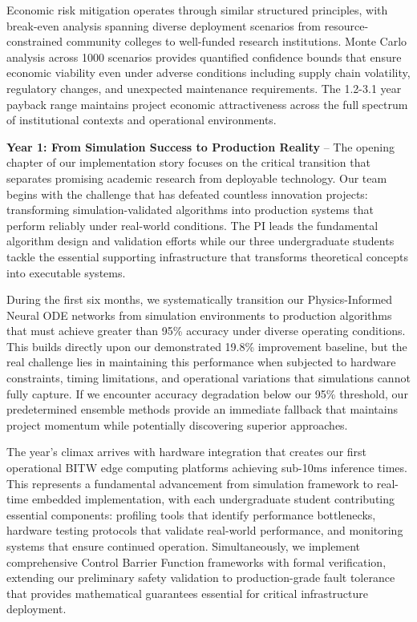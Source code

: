 \documentclass[12pt]{article}
\begin{document}
Economic risk mitigation operates through similar structured principles, with break-even analysis spanning diverse deployment scenarios from resource-constrained community colleges to well-funded research institutions. Monte Carlo analysis across 1000 scenarios provides quantified confidence bounds that ensure economic viability even under adverse conditions including supply chain volatility, regulatory changes, and unexpected maintenance requirements. The 1.2-3.1 year payback range maintains project economic attractiveness across the full spectrum of institutional contexts and operational environments.

\textbf{Year 1: From Simulation Success to Production Reality} – The opening chapter of our implementation story focuses on the critical transition that separates promising academic research from deployable technology. Our team begins with the challenge that has defeated countless innovation projects: transforming simulation-validated algorithms into production systems that perform reliably under real-world conditions. The PI leads the fundamental algorithm design and validation efforts while our three undergraduate students tackle the essential supporting infrastructure that transforms theoretical concepts into executable systems.

During the first six months, we systematically transition our Physics-Informed Neural ODE networks from simulation environments to production algorithms that must achieve greater than 95\% accuracy under diverse operating conditions. This builds directly upon our demonstrated 19.8\% improvement baseline, but the real challenge lies in maintaining this performance when subjected to hardware constraints, timing limitations, and operational variations that simulations cannot fully capture. If we encounter accuracy degradation below our 95\% threshold, our predetermined ensemble methods provide an immediate fallback that maintains project momentum while potentially discovering superior approaches.

The year's climax arrives with hardware integration that creates our first operational BITW edge computing platforms achieving sub-10ms inference times. This represents a fundamental advancement from simulation framework to real-time embedded implementation, with each undergraduate student contributing essential components: profiling tools that identify performance bottlenecks, hardware testing protocols that validate real-world performance, and monitoring systems that ensure continued operation. Simultaneously, we implement comprehensive Control Barrier Function frameworks with formal verification, extending our preliminary safety validation to production-grade fault tolerance that provides mathematical guarantees essential for critical infrastructure deployment.
\end{document}
